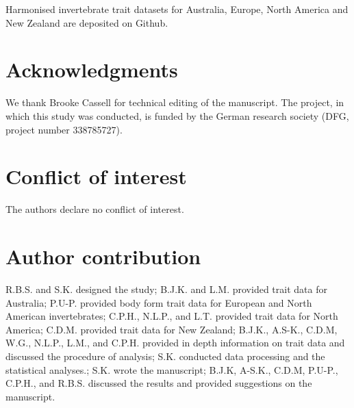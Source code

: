 \documentclass[12pt]{article}
\begin{document}
Harmonised invertebrate trait datasets for Australia, Europe, North America and New Zealand are deposited on Github. %

\section*{Acknowledgments}

We thank Brooke Cassell for technical editing of the manuscript. The project, in which this study was conducted, is funded by the German research society (DFG, project number 338785727).

\section*{Conflict of interest}

The authors declare no conflict of interest.

\section*{Author contribution}
R.B.S. and S.K. designed the study; B.J.K. and L.M. provided trait data for Australia; P.U-P. provided body form trait data for European and North American invertebrates; C.P.H., N.L.P., and L.T. provided trait data for North America; C.D.M. provided trait data for New Zealand;
B.J.K., A.S-K., C.D.M, W.G., N.L.P., L.M., and C.P.H. provided in depth information on trait data and discussed the procedure of analysis; S.K. conducted data processing and the statistical analyses.; S.K. wrote the manuscript; B.J.K, A-S.K., C.D.M, P.U-P., C.P.H., and R.B.S. discussed the results and provided suggestions on the manuscript.

\newpage


\printbibliography

\newpage

\setcounter{table}{0}
\setcounter{figure}{0}
\renewcommand{\thetable}{S\arabic{table}}
\renewcommand{\thefigure}{S\arabic{figure}}


\end{document}
